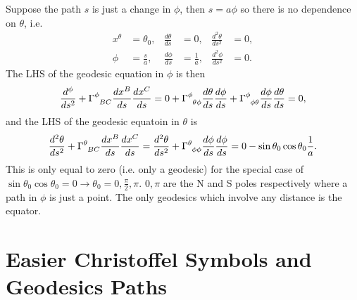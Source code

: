 \documentclass[a4paper, 11pt, normalem]{report}
\begin{document}
\begin{example}
Suppose the path $s$ is just a change in $\phi$, then $s=a\phi$ so there is no dependence on $\theta$, i.e. 
\begin{align}
    x^\theta &= \theta_0, & \frac{d\theta}{ds} &= 0, & \frac{d^2\theta}{ds^2} &= 0,\\
    \phi &= \frac{s}{a}, & \frac{d\phi}{ds} &= \frac1a, & \frac{d^2\phi}{ds^2} &= 0.
\end{align}
The LHS of the geodesic equation in $\phi$ is then
\begin{align}
    \frac{d^\phi}{ds^2} + \tensor{\Gamma}{^\phi_{BC}}\frac{dx^B}{ds}\frac{dx^C}{ds} = 0 + \tensor{\Gamma}{^\phi_{\theta\phi}}\frac{d\theta}{ds}\frac{d\phi}{ds} + \tensor{\Gamma}{^\phi_{\phi\theta}}\frac{d\phi}{ds}\frac{d\theta}{ds} = 0,
\end{align}
and the LHS of the geodesic equatoin in $\theta$ is 
\begin{align}
    \frac{d^2\theta}{ds^2} + \tensor{\Gamma}{^\theta_{BC}}\frac{dx^B}{ds}\frac{dx^C}{ds}=\frac{d^2\theta}{ds^2}+\tensor{\Gamma}{^\theta_{\phi\phi}}\frac{d\phi}{ds}\frac{d\phi}{ds} = 0 - \sin\theta_0\cos\theta_0\frac1a.
\end{align}
This is only equal to zero (i.e. only a geodesic) for the special case of $\sin\theta_0\cos\theta_0=0\to\theta_0=0,\frac{\pi}{2},\pi$.
$0,\pi$ are the N and S poles respectively where a path in $\phi$ is just a point. 
The only geodesics which involve any distance is the equator. 
\end{example}

\chapter{Easier Christoffel Symbols and Geodesics Paths}
\end{document}
